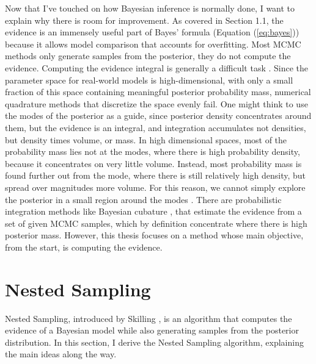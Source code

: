 \documentclass[12pt, a4paper]{report}
\begin{document}
Now that I've touched on how Bayesian inference is normally done, I want to explain why there is room for improvement.
As covered in Section 1.1, the evidence is an immensely useful part of Bayes' formula (Equation (\ref{eq:bayes})) because it allows model comparison that accounts for overfitting.
Most MCMC methods only generate samples from the posterior, they do not compute the evidence.
Computing the evidence integral is generally a difficult task \cite[221]{mcelreath}.
Since the parameter space for real-world models is high-dimensional, with only a small fraction of this space containing meaningful posterior probability mass, numerical quadrature methods that discretize the space evenly fail.
One might think to use the modes of the posterior as a guide, since posterior density concentrates around them, but the evidence is an integral, and integration accumulates not densities, but density times volume, or mass.
In high dimensional spaces, most of the probability mass lies not at the modes, where there is high probability density, because it concentrates on very little volume.
Instead, most probability mass is found further out from the mode, where there is still relatively high density, but spread over magnitudes more volume.
For this reason, we cannot simply explore the posterior in a small region around the modes \cite{betancourt_talk}.
There are probabilistic integration methods like Bayesian cubature \cite{bayesian_cubature}, that estimate the evidence from a set of given MCMC samples, which by definition concentrate where there is high posterior mass.
However, this thesis focuses on a method whose main objective, from the start, is computing the evidence.


\section{Nested Sampling}
Nested Sampling, introduced by Skilling \cite{skilling}, is an algorithm that computes the evidence of a Bayesian model while also generating samples from the posterior distribution.
In this section, I derive the Nested Sampling algorithm, explaining the main ideas along the way.

\FloatBarrier
\end{document}
